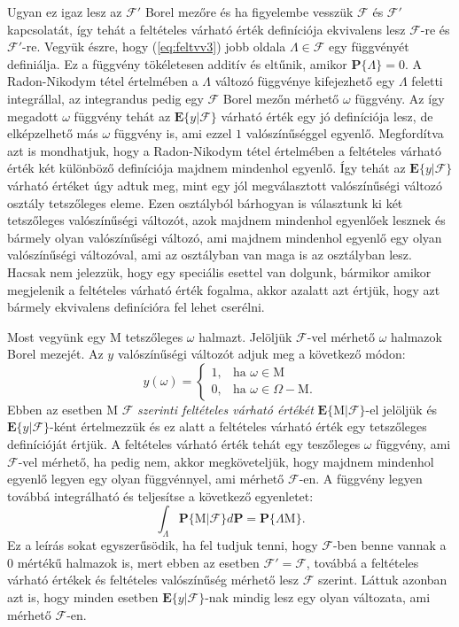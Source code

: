 \documentclass{article}
\begin{document}
Ugyan ez igaz lesz az $\mathscr{F}'$ Borel mezőre és ha figyelembe vesszük $\mathscr{F}$ és $\mathscr{F}'$ kapcsolatát, így tehát a feltételes várható érték definíciója ekvivalens lesz $\mathscr{F}$-re és $\mathscr{F}'$-re. Vegyük észre, hogy (\ref{eq:feltvv3}) jobb oldala $\Lambda \in \mathscr{F}$ egy függvényét definiálja. Ez a függvény tökéletesen additív és eltűnik, amikor $\mathbf{P}\{\Lambda\} = 0$. A Radon-Nikodym tétel értelmében a $\Lambda$ változó függvénye kifejezhető egy $\Lambda$ feletti integrállal, az integrandus pedig egy $\mathscr{F}$ Borel mezőn mérhető $\omega$ függvény. Az így megadott $\omega$ függvény tehát az $\mathrm{\textbf{E}}\{y|\mathscr{F}\}$ várható érték egy jó definíciója lesz, de elképzelhető más $\omega$ függvény is, ami ezzel $1$ valószínűséggel egyenlő. Megfordítva azt is mondhatjuk, hogy a Radon-Nikodym tétel értelmében a feltételes várható érték két különböző definíciója majdnem mindenhol egyenlő. Így tehát az $\mathrm{\textbf{E}}\{y|\mathscr{F}\}$ várható értéket úgy adtuk meg, mint egy jól megválasztott valószínűségi változó osztály tetszőleges eleme. Ezen osztályból bárhogyan is választunk ki két tetszőleges valószínűségi változót, azok majdnem mindenhol egyenlőek lesznek és bármely olyan valószínűségi változó, ami majdnem mindenhol egyenlő egy olyan valószínűségi változóval, ami az osztályban van maga is az osztályban lesz. Hacsak nem jelezzük, hogy egy speciális esettel van dolgunk, bármikor amikor megjelenik a feltételes várható érték fogalma, akkor azalatt azt értjük, hogy azt bármely ekvivalens definícióra fel lehet cserélni.

Most vegyünk egy $\mathrm{M}$ tetszőleges $\omega$ halmazt. Jelöljük $\mathscr{F}$-vel mérhető $\omega$ halmazok Borel mezejét. Az $y$ valószínűségi változót adjuk meg a következő módon:
\[
y(\omega) = \begin{cases}
    1, & \text{ha } \omega \in \mathrm{M} \\
    0, & \text{ha } \omega \in \Omega - \mathrm{M}.
\end{cases}
\]
Ebben az esetben $\mathrm{M}$ $\mathscr{F}$ \textit{szerinti feltételes várható értékét} $\mathrm{\textbf{E}}\{\mathrm{M}|\mathscr{F}\}$-el jelöljük és $\mathrm{\textbf{E}}\{y|\mathscr{F}\}$-ként értelmezzük és ez alatt a feltételes várható érték egy tetszőleges definícióját értjük. A feltételes várható érték tehát egy teszőleges $\omega$ függvény, ami $\mathscr{F}$-vel mérhető, ha pedig nem, akkor megköveteljük, hogy majdnem mindenhol egyenlő legyen egy olyan függvénnyel, ami mérhető $\mathscr{F}$-en. A függvény legyen továbbá integrálható és teljesítse a következő egyenletet: 
\begin{equation}
	\int_{\Lambda} \mathrm{\textbf{P}}\{ \mathrm{M} | \mathscr{F} \} d\mathrm{\textbf{P}} = \mathrm{\textbf{P}}\{\Lambda \mathrm{M}\}.
	\label{eq:feltvv4}
\end{equation}
Ez a leírás sokat egyszerűsödik, ha fel tudjuk tenni, hogy $\mathscr{F}$-ben benne vannak a $0$ mértékű halmazok is, mert ebben az esetben $\mathscr{F}' = \mathscr{F}$, továbbá a feltételes várható értékek és feltételes valószínűség mérhető lesz $\mathscr{F}$ szerint. Láttuk azonban azt is, hogy minden esetben $\mathrm{\textbf{E}}\{y|\mathscr{F}\}$-nak mindig lesz egy olyan változata, ami mérhető $\mathscr{F}$-en.
\end{document}
